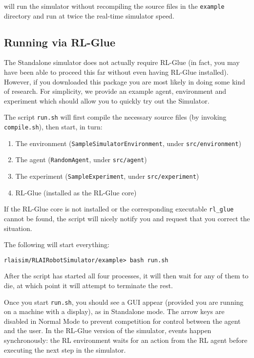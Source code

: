 \documentclass[12pt]{article}
\newcommand{\code}[1]{\texttt{#1}}
\begin{document}
will run the simulator without recompiling the source files in the
\code{example} directory and run at twice the real-time simulator speed.

\subsection{Running via RL-Glue}

The Standalone simulator does not actually require RL-Glue (in fact, you 
may have been able to proceed this far without even having RL-Glue installed).
However, if you downloaded this package you are most likely in doing some
kind of research. For simplicity, we provide an example agent, environment
and experiment which should allow you to quickly try out the Simulator.

The script \code{run.sh} will first compile the necessary source files (by
invoking \code{compile.sh}), then start, in turn:

\begin{enumerate}
\item{The environment (\code{SampleSimulatorEnvironment}, under \code{src/environment})}
\item{The agent (\code{RandomAgent}, under \code{src/agent})}
\item{The experiment (\code{SampleExperiment}, under \code{src/experiment})}
\item{RL-Glue (installed as the RL-Glue core)}
\end{enumerate}

If the RL-Glue core is not installed or the corresponding executable 
\verb+rl_glue+ cannot be found, the script will nicely notify you and request
that you correct the situation.

The following will start everything: 

\begin{verbatim}
rlaisim/RLAIRobotSimulator/example> bash run.sh 
\end{verbatim}

After the script has started all four processes, it will then wait
for any of them to die, at which point it will attempt to terminate the rest. 

Once you start \verb+run.sh+, you should see a GUI appear (provided you are
running on a machine with a display), as in Standalone mode.
The arrow keys are disabled in Normal Mode to prevent competition for control 
between the agent and the user. In the RL-Glue version of the simulator,
events happen synchronously: the RL environment waits for an action from the
RL agent before executing the next step in the simulator.
\end{document}
